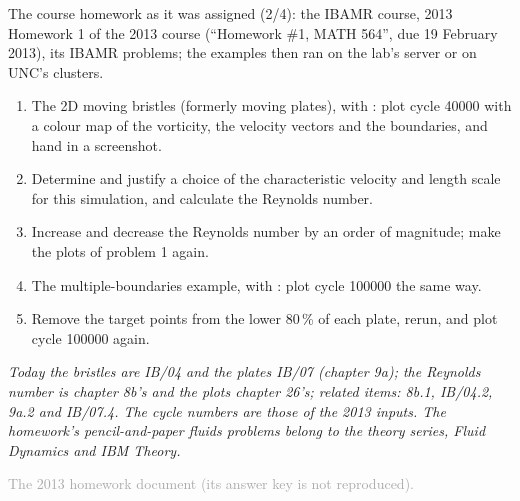 \documentclass[aspectratio=169,11pt]{beamer}
\newcommand{\sourcecredit}[1]{\vfill\begin{flushright}\tiny\textcolor{DarkGray}{#1}\end{flushright}}
\begin{document}
\begin{frame}{The course homework as it was assigned (2/4): the IBAMR course, 2013}
\label{fr:hw2}
\footnotesize
Homework 1 of the 2013 course (``Homework \#1, MATH 564'', due 19 February 2013), its IBAMR problems; the examples then ran on the lab's server or on UNC's clusters.
\begin{enumerate}\setlength{\itemsep}{2pt}
  \item The 2D moving bristles (formerly moving plates), with : plot cycle 40000 with a colour map of the vorticity, the velocity vectors and the boundaries, and hand in a screenshot.
  \item Determine and justify a choice of the characteristic velocity and length scale for this simulation, and calculate the Reynolds number.
  \item Increase and decrease the Reynolds number by an order of magnitude; make the plots of problem 1 again.
  \item The multiple-boundaries example, with : plot cycle 100000 the same way.
  \item Remove the target points from the lower 80\,\% of each plate, rerun, and plot cycle 100000 again.
\end{enumerate}
\emph{Today the bristles are IB/04 and the plates IB/07 (chapter 9a); the Reynolds number is chapter 8b's and the plots chapter 26's; related items: 8b.1, IB/04.2, 9a.2 and IB/07.4. The cycle numbers are those of the 2013 inputs. The homework's pencil-and-paper fluids problems belong to the theory series, \emph{Fluid Dynamics and IBM Theory}.}
\sourcecredit{The 2013 homework document (its answer key is not reproduced).}
\end{frame}
\end{document}
